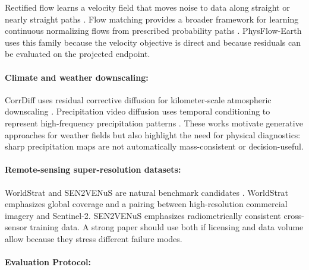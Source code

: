 \documentclass{article}
\begin{document}
Rectified flow learns a velocity field that moves noise to data along straight or nearly straight paths \citep{liu2022rectified}. Flow matching provides a broader framework for learning continuous normalizing flows from prescribed probability paths \citep{lipman2023flow}. PhysFlow-Earth uses this family because the velocity objective is direct and because residuals can be evaluated on the projected endpoint.

\paragraph{Climate and weather downscaling:}

CorrDiff uses residual corrective diffusion for kilometer-scale atmospheric downscaling \citep{mardani2023corrdiff}. Precipitation video diffusion uses temporal conditioning to represent high-frequency precipitation patterns \citep{leinonen2023precipitation}. These works motivate generative approaches for weather fields but also highlight the need for physical diagnostics: sharp precipitation maps are not automatically mass-consistent or decision-useful.

\paragraph{Remote-sensing super-resolution datasets:}

WorldStrat and SEN2VENuS are natural benchmark candidates \citep{cornebise2022worldstrat,michel2022sen2venus}. WorldStrat emphasizes global coverage and a pairing between high-resolution commercial imagery and Sentinel-2. SEN2VENuS emphasizes radiometrically consistent cross-sensor training data. A strong paper should use both if licensing and data volume allow because they stress different failure modes.

\paragraph{Evaluation Protocol:}
\end{document}
